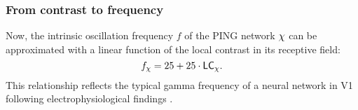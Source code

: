 \subsubsection{From contrast to frequency}

Now, the intrinsic oscillation frequency $f$ of the PING network $\chi$ can be approximated with a linear function of the local contrast in its receptive field:
\begin{equation}
    f_\chi = 25 + 25 \cdot \mathsf{LC}_\chi.
\end{equation}
This relationship reflects the typical gamma frequency of a neural network in V1 following electrophysiological findings \cite{Roberts2013, MaryamPLACEHOLDER}.
